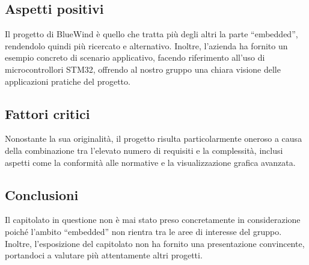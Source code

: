 \documentclass[italian, 12pt]{article}
\begin{document}
\subsection{Aspetti positivi}
Il progetto di BlueWind è quello che tratta più degli altri la parte “embedded”, rendendolo quindi più ricercato e alternativo. Inoltre, l'azienda ha fornito un esempio concreto di scenario applicativo, facendo riferimento all'uso di microcontrollori STM32, offrendo al nostro gruppo una chiara visione delle applicazioni pratiche del progetto.

\subsection{Fattori critici}
Nonostante la sua originalità, il progetto risulta particolarmente oneroso a causa della combinazione tra l'elevato numero di requisiti e la complessità, inclusi aspetti come la conformità alle normative e la visualizzazione grafica avanzata.

\subsection{Conclusioni}
Il capitolato in questione non è mai stato preso concretamente in considerazione poiché l’ambito “embedded” non rientra tra le aree di interesse del gruppo. Inoltre, l’esposizione del capitolato non ha fornito una presentazione convincente, portandoci a valutare più attentamente altri progetti.
\end{document}
